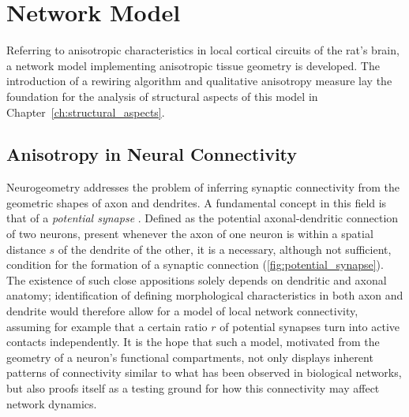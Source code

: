 \chapter{Network Model}\label{ch:Network Model} 

Referring to anisotropic characteristics in local cortical circuits of
the rat's brain, a network model implementing anisotropic tissue
geometry is developed. The introduction of a rewiring algorithm and
qualitative anisotropy measure %
lay the foundation for the analysis of structural aspects of this
model in Chapter~\ref{ch:structural_aspects}.

\clearpage
\section{Anisotropy in Neural Connectivity}\label{sec:biol_anisotropy}

Neurogeometry addresses the problem of inferring
synaptic connectivity from the geometric shapes of axon and
dendrites. A fundamental concept in this field is that of a
\textit{potential synapse}
\parencite{Stepanyants2002}. Defined as the potential axonal-dendritic
connection of two neurons, present whenever the axon of one neuron is
within a spatial distance $s$ of the dendrite of the other, it is a
necessary, although not sufficient, condition for the formation of a
synaptic connection (\autoref{fig:potential_synapse}). The existence
of such close appositions solely depends on dendritic and axonal
anatomy; identification of defining morphological characteristics in
both axon and dendrite would therefore allow for a model of local
network connectivity, assuming for example that a certain ratio $r$ of
potential synapses turn into active contacts independently. It is the
hope that such a model, motivated from the geometry of a neuron's
functional compartments, not only displays inherent patterns of
connectivity similar to what has been observed in biological networks,
but also proofs itself as a testing ground for how this connectivity
may affect network dynamics.

